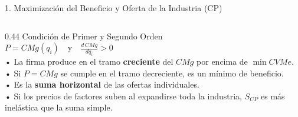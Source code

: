 \documentclass[aspectratio=169, 10pt]{beamer}
\begin{document}
\begin{frame}{1. Maximización del Beneficio y Oferta de la Industria (CP)}
\begin{columns}[T]
    \begin{column}{0.44\textwidth}
      {\scriptsize\color{grisTexto}Condición de Primer y Segundo Orden}\\[1pt]
      {\large\color{azulPrincipal}\textbf{\(P = CMg(q_i) \quad \text{y} \quad \frac{d\,CMg}{dq_i} > 0\)}}\\[5pt]
      {\scriptsize
        • La firma produce en el tramo \textbf{creciente} del \(CMg\) por encima de \(\min CVMe\).\\
        • Si \(P = CMg\) se cumple en el tramo decreciente, es un mínimo de beneficio.\\[5pt]
      }
      {\scriptsize
        • Es la \textbf{suma horizontal} de las ofertas individuales.\\
        • Si los precios de factores suben al expandirse toda la industria, \(S_{CP}\) es más inelástica que la suma simple.
      }
    \end{column}
  \end{columns}

\end{frame}
\end{document}
